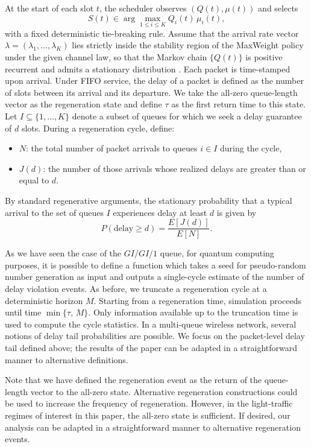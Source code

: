 \documentclass[11pt]{article}
\newcommand{\E}{E}
\begin{document}
At the start of each slot $t$, the scheduler observes $(Q(t),\mu(t))$ and selects
\[
S(t)\in \arg\max_{1\le i\le K} Q_i(t)\,\mu_i(t),
\]
with a fixed deterministic tie-breaking rule.
Assume that the arrival rate vector $\lambda=(\lambda_1,\dots,\lambda_K)$ lies
strictly inside the stability region of the MaxWeight policy under the given
channel law, so that the Markov chain $\{Q(t)\}$ is positive recurrent and admits
a stationary distribution \cite{srikant2014communication}.
Each packet is time-stamped upon arrival.
Under FIFO service, the delay of a packet is defined as the number of slots
between its arrival and its departure.
We take the all-zero queue-length vector as the regeneration state and define
$\tau$ as the first return time to this state.
Let $I\subseteq\{1,\dots,K\}$ denote a subset of queues for which we seek a
delay guarantee of $d$ slots.
During a regeneration cycle, define:
\begin{itemize}
\item $N$: the total number of packet arrivals to queues $i\in I$ during the cycle,
\item $J(d)$: the number of those arrivals whose realized delays are greater than
or equal to $d$.
\end{itemize}

By standard regenerative arguments, the stationary probability that a
typical arrival to the set of queues $I$ experiences delay at least $d$ is given by
\[
P(\text{delay} \ge d)
=
\frac{\E[J(d)]}{\E[N]}.
\]

As we have seen the case of the $GI/GI/1$ queue, for quantum computing purposes, it is possible to define a function which takes a seed for pseudo-random number generation as input and outputs a single-cycle estimate of the number of delay violation events.
As before, we truncate a
regeneration cycle at a deterministic horizon $M$.
Starting from a regeneration time, simulation proceeds until time
$
\min\{\tau,\,M\}.
$
Only information available up to the truncation time is used to compute the
cycle statistics.
In a multi-queue wireless network, several notions of delay tail probabilities
are possible.
We focus on the packet-level delay tail defined above;
the results of the
paper can be adapted in a straightforward manner to alternative definitions.

Note that we have defined the regeneration event as the return of the queue-length vector to the all-zero state. Alternative regeneration constructions could be used to increase the frequency of regeneration. However, in the light-traffic regimes of interest in this paper, the all-zero state is sufficient. If desired, our analysis can be adapted in a straightforward manner to alternative regeneration events.
\end{document}
